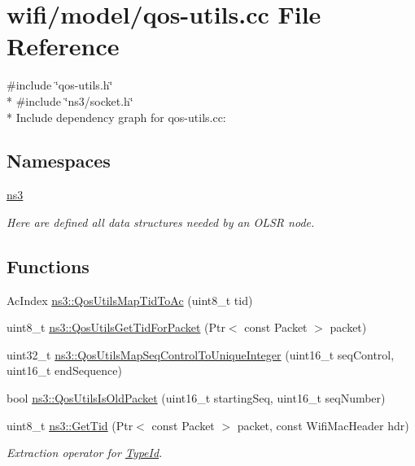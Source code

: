 \hypertarget{qos-utils_8cc}{}\section{wifi/model/qos-\/utils.cc File Reference}
\label{qos-utils_8cc}
{\ttfamily \#include \char`\"{}qos-\/utils.\+h\char`\"{}}\\*
{\ttfamily \#include \char`\"{}ns3/socket.\+h\char`\"{}}\\*
Include dependency graph for qos-\/utils.cc\+:
\subsection*{Namespaces}
\begin{DoxyCompactItemize}
\item 
 \hyperlink{namespacens3}{ns3}
\begin{DoxyCompactList}\small\item\em Here are defined all data structures needed by an O\+L\+SR node. \end{DoxyCompactList}\end{DoxyCompactItemize}
\subsection*{Functions}
\begin{DoxyCompactItemize}
\item 
Ac\+Index \hyperlink{group__wifi_ga4e36efcff6dd83eaee42e1af0de43d48}{ns3\+::\+Qos\+Utils\+Map\+Tid\+To\+Ac} (uint8\+\_\+t tid)
\item 
uint8\+\_\+t \hyperlink{group__wifi_gaa7ad20082f78b63633d0557d24927150}{ns3\+::\+Qos\+Utils\+Get\+Tid\+For\+Packet} (Ptr$<$ const Packet $>$ packet)
\item 
uint32\+\_\+t \hyperlink{group__wifi_ga841296fae895cac77a0e14183b8134e0}{ns3\+::\+Qos\+Utils\+Map\+Seq\+Control\+To\+Unique\+Integer} (uint16\+\_\+t seq\+Control, uint16\+\_\+t end\+Sequence)
\item 
bool \hyperlink{group__wifi_ga5cb9ea723837c5a036e622612f2d0bb0}{ns3\+::\+Qos\+Utils\+Is\+Old\+Packet} (uint16\+\_\+t starting\+Seq, uint16\+\_\+t seq\+Number)
\item 
uint8\+\_\+t \hyperlink{group__wifi_ga92cc18e2c5aa6bed3728860bbad76ff8}{ns3\+::\+Get\+Tid} (Ptr$<$ const Packet $>$ packet, const Wifi\+Mac\+Header hdr)
\begin{DoxyCompactList}\small\item\em Extraction operator for \hyperlink{classns3_1_1TypeId}{Type\+Id}. \end{DoxyCompactList}\end{DoxyCompactItemize}

